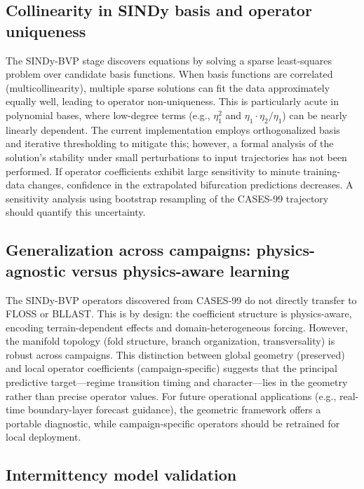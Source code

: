 \documentclass[12pt,a4paper]{article}
\begin{document}
\subsection{Collinearity in SINDy basis and operator uniqueness}

The SINDy-BVP stage discovers equations by solving a sparse least-squares problem over candidate basis functions. When basis functions are correlated (multicollinearity), multiple sparse solutions can fit the data approximately equally well, leading to operator non-uniqueness. This is particularly acute in polynomial bases, where low-degree terms (e.g., $\eta_1^2$ and $\eta_1 \cdot \eta_2 / \eta_1$) can be nearly linearly dependent. The current implementation employs orthogonalized basis and iterative thresholding to mitigate this; however, a formal analysis of the solution's stability under small perturbations to input trajectories has not been performed. If operator coefficients exhibit large sensitivity to minute training-data changes, confidence in the extrapolated bifurcation predictions decreases. A sensitivity analysis using bootstrap resampling of the CASES-99 trajectory should quantify this uncertainty.

\subsection{Generalization across campaigns: physics-agnostic versus physics-aware learning}

The SINDy-BVP operators discovered from CASES-99 do not directly transfer to FLOSS or BLLAST. This is by design: the coefficient structure is physics-aware, encoding terrain-dependent effects and domain-heterogeneous forcing. However, the manifold topology (fold structure, branch organization, transversality) is robust across campaigns. This distinction between global geometry (preserved) and local operator coefficients (campaign-specific) suggests that the principal predictive target---regime transition timing and character---lies in the geometry rather than precise operator values. For future operational applications (e.g., real-time boundary-layer forecast guidance), the geometric framework offers a portable diagnostic, while campaign-specific operators should be retrained for local deployment.

\subsection{Intermittency model validation}
\end{document}
